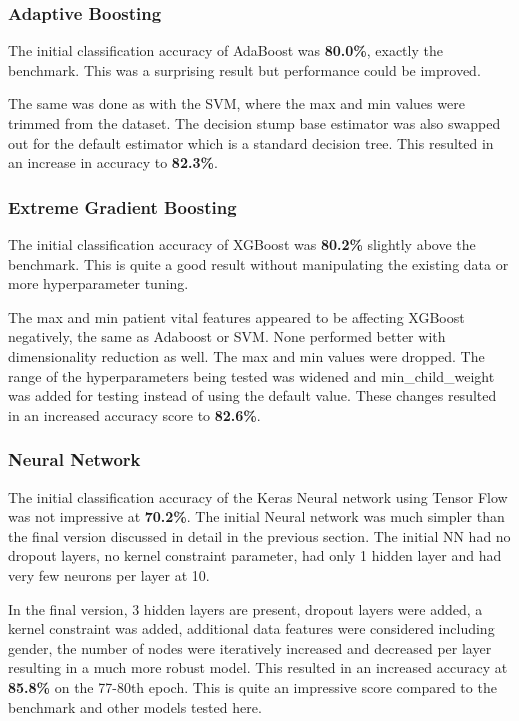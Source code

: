 \documentclass[11pt]{article}
\begin{document}
	\subsubsection{Adaptive Boosting}
	The initial classification accuracy of AdaBoost was \textbf{80.0\%}, exactly the benchmark. This was a surprising result but performance could be improved.
	
	The same was done as with the SVM, where the max and min values were trimmed from the dataset. The decision stump base estimator was also swapped out for the default estimator which is a standard decision tree. This resulted in an increase in accuracy to \textbf{82.3\%}. 
	
	\subsubsection{Extreme Gradient Boosting}
	The initial classification accuracy of XGBoost was \textbf{80.2\%} slightly above the benchmark. This is quite a good result without manipulating the existing data or more hyperparameter tuning.
	
	The max and min patient vital features appeared to be affecting XGBoost negatively, the same as Adaboost or SVM. None performed better with dimensionality reduction as well. The max and min values were dropped. The range of the hyperparameters being tested was widened and min\_child\_weight was added for testing instead of using the default value. These changes resulted in an increased accuracy score to \textbf{82.6\%}. 
	
	\subsubsection{Neural Network}
	The initial classification accuracy of the Keras Neural network using Tensor Flow was not impressive at \textbf{70.2\%}. The initial Neural network was much simpler than the final version discussed in detail in the previous section. The initial NN had no dropout layers, no kernel constraint parameter, had only 1 hidden layer and had very few neurons per layer at 10.
	
	In the final version, 3 hidden layers are present, dropout layers were added, a kernel constraint was added, additional data features were considered including gender, the number of nodes were iteratively increased and decreased per layer resulting in a much more robust model. This resulted in an increased accuracy at \textbf{85.8\%} on the 77-80th epoch. This is quite an impressive score compared to the benchmark and other models tested here.
	
\end{document}
